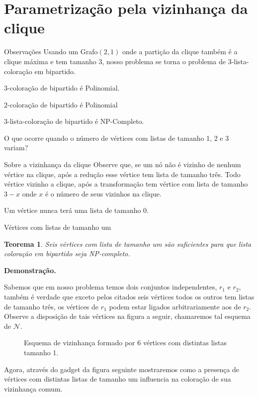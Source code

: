 \documentclass[9pt, compress]{beamer}
\newtheorem{teorema}{Teorema}
\newcommand{\?}{\textcolor{warn}{\textit{?}}}
\begin{document}
     \section{Parametrização pela vizinhança da clique}
     \begin{frame}{Observações}
       Usando um Grafo$(2,1)$ onde a partição da clique também é a clique máxima e tem tamanho 3, nosso problema se torna o problema de 3-lista-coloração em bipartido.
       
       3-coloração de bipartido é Polinomial.
       
       2-coloração de bipartido é Polinomial 
       
       3-lista-coloração de bipartido é NP-Completo.
       
       O que ocorre quando o número de vértices com listas de tamanho 1, 2 e 3 variam? 
     \end{frame}
     \begin{frame}{Sobre a vizinhança da clique}
       Observe que, se um nó não é vizinho de nenhum vértice na clique, após a redução esse vértice tem lista de tamanho três. Todo vértice vizinho a clique, após a transformação tem vértice com lista de tamanho $3-x$ onde $x$ é o número de seus vizinhos na clique.
       
       Um vértice nunca terá uma lista de tamanho 0.
     \end{frame}
     \begin{frame}{Vértices com listas de tamanho um}
       \begin{teorema}
       Seis vértices com lista de tamanho um são suficientes para que lista coloração em bipartido seja NP-completo.
       \end{teorema}
       \textbf{Demonstração.}
       
       Sabemos que em nosso problema temos dois conjuntos independentes, $r_1$ e $r_2$, também é verdade que exceto pelos citados seis vértices todos os outros tem listas de tamanho três, os vértices de $r_1$ podem estar ligados arbitrariamente aos de $r_2$. Observe a disposição de tais vértices na figura a seguir, chamaremos tal esquema de $\mathcal{N}$.
     \end{frame}
     \begin{frame}
        
        \begin{figure}[H]
		        \centering
		        \fontsize{4}{10}
		        
		        \caption{Esquema de vizinhança formado por 6 vértices com distintas listas tamanho 1. }
		        \label{fig:seis-vertices-lista-um}
        \end{figure}
    
        Agora, através do gadget da figura seguinte mostraremos como a presença de vértices com distintas listas de tamanho um influencia na coloração de sua vizinhança comum.
      \end{frame}
\end{document}
